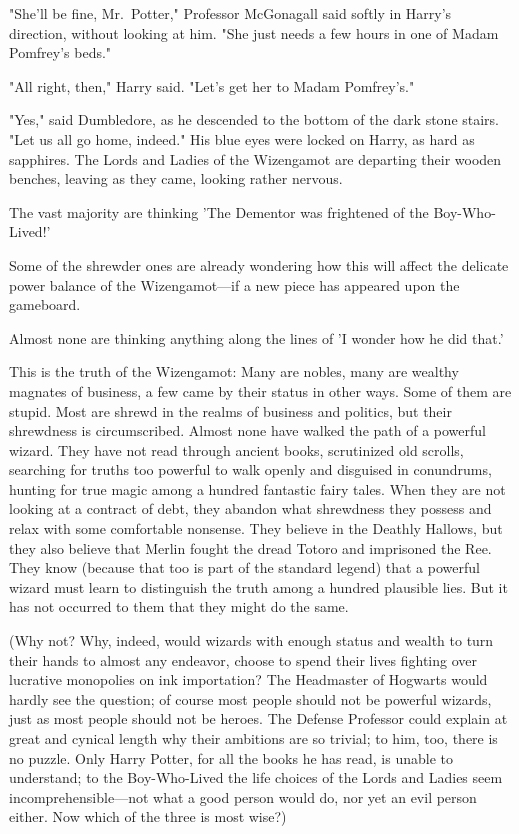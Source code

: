"She'll be fine, Mr.~Potter," Professor McGonagall said softly in Harry's 
direction, without looking at him. "She just needs a few hours in one of Madam 
Pomfrey's beds."

"All right, then," Harry said. "Let's get her to Madam Pomfrey's."

"Yes," said Dumbledore, as he descended to the bottom of the dark stone stairs. 
"Let us all go home, indeed." His blue eyes were locked on Harry, as hard as 
sapphires.
\sbreak
The Lords and Ladies of the Wizengamot are departing their wooden benches, 
leaving as they came, looking rather nervous.

The vast majority are thinking 'The Dementor was frightened of the 
Boy-Who-Lived!'

Some of the shrewder ones are already wondering how this will affect the 
delicate power balance of the Wizengamot---if a new piece has appeared upon the 
gameboard.

Almost none are thinking anything along the lines of 'I wonder how he did that.'

This is the truth of the Wizengamot: Many are nobles, many are wealthy magnates 
of business, a few came by their status in other ways. Some of them are stupid. 
Most are shrewd in the realms of business and politics, but their shrewdness is 
circumscribed. Almost none have walked the path of a powerful wizard. They have 
not read through ancient books, scrutinized old scrolls, searching for truths 
too powerful to walk openly and disguised in conundrums, hunting for true magic 
among a hundred fantastic fairy tales. When they are not looking at a contract 
of debt, they abandon what shrewdness they possess and relax with some 
comfortable nonsense. They believe in the Deathly Hallows, but they also 
believe that Merlin fought the dread Totoro and imprisoned the Ree. They know 
(because that too is part of the standard legend) that a powerful wizard must 
learn to distinguish the truth among a hundred plausible lies. But it has not 
occurred to them that they might do the same.

(Why not? Why, indeed, would wizards with enough status and wealth to turn 
their hands to almost any endeavor, choose to spend their lives fighting over 
lucrative monopolies on ink importation? The Headmaster of Hogwarts would 
hardly see the question; of course most people should not be powerful wizards, 
just as most people should not be heroes. The Defense Professor could explain 
at great and cynical length why their ambitions are so trivial; to him, too, 
there is no puzzle. Only Harry Potter, for all the books he has read, is unable 
to understand; to the Boy-Who-Lived the life choices of the Lords and Ladies 
seem incomprehensible---not what a good person would do, nor yet an evil person 
either. Now which of the three is most wise?)

